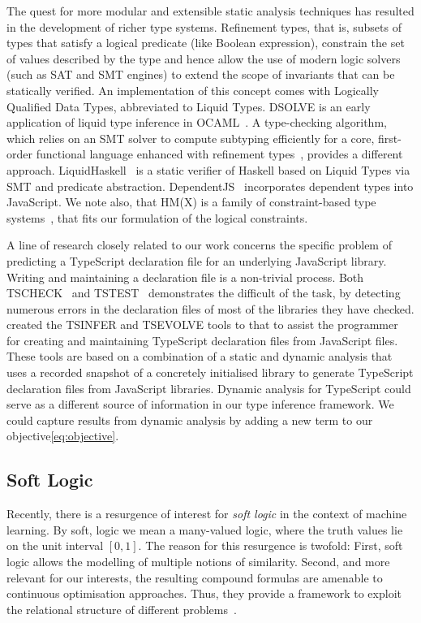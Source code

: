 \documentclass[acmsmall, review, anonymous]{acmart}\settopmatter{printfolios=true,printccs=false,printacmref=false}
\begin{document}
The quest for more modular and extensible static analysis techniques has
resulted in the development of richer type systems.
Refinement types, that is, subsets of types that satisfy a logical predicate (like Boolean expression),
constrain the set of values described by the type and hence allow the use of
modern logic solvers (such as SAT and SMT engines) to extend the
scope of invariants that can be statically verified.
An implementation of this concept comes with Logically Qualified Data Types,
abbreviated to Liquid Types.
DSOLVE is an early application of liquid type inference in OCAML~\citep{liquid}.
A type-checking algorithm, which relies on an SMT solver
to compute subtyping efficiently for a core, first-order functional language
enhanced with refinement types~\citep{semanticSMT}, provides a different
approach.
LiquidHaskell~\citep{refHaskell} is a static verifier of
Haskell based on Liquid Types via SMT and predicate
abstraction.
DependentJS~\citep{dependentJS} incorporates dependent types into JavaScript. We note also, that HM(X) is a family of constraint-based type
systems~\citep{odersky99,pottier05}, that fits our formulation of the logical constraints.

A line of research closely related to our work concerns
the specific problem of predicting a TypeScript declaration file for an underlying JavaScript library. Writing and maintaining a declaration file is a non-trivial process. Both TSCHECK~\cite{feldthaus14} and TSTEST~\cite{kristensen17} demonstrates the difficult of the task, by detecting numerous errors in the declaration files of most of the libraries they have checked. \cite{tstools17} created the TSINFER and TSEVOLVE tools to that to assist the 
programmer for creating and maintaining TypeScript declaration files from JavaScript files. These tools are based on a combination of a static and dynamic analysis that uses a recorded snapshot of a concretely initialised library to generate TypeScript declaration files from JavaScript libraries. Dynamic analysis for TypeScript could serve as a different
source of information in our type inference framework. We
could capture results from dynamic analysis by adding a new term to our objective\eqref{eq:objective}.

 
\subsection{Soft Logic}\label{ssec:softlogic}

Recently, there is a resurgence of interest for \textit{soft logic} in the context of machine learning. By soft, logic we mean a many-valued logic, where the truth values lie on the unit interval $[0,1]$. The 
reason for this resurgence is twofold: First,
soft logic allows the modelling of multiple notions
of similarity. Second, and more relevant for our
interests, the resulting compound formulas are 
amenable to continuous optimisation approaches. Thus, they provide a framework to exploit the relational structure of different problems~\cite{kimmig12}.
\end{document}
